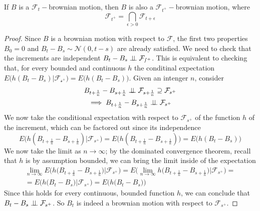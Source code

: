 \begin{proposition}
    If $B$ is a $\mathcal{F}_t-$brownian motion, then $B$ is also a $\mathcal{F}_{t^+}-$brownian motion, where
    \begin{equation*}
        \mathcal{F}_{t^+} = \bigcap_{\epsilon > 0} \mathcal{F}_{t+\epsilon}
    \end{equation*}
\end{proposition}
\begin{proof}
    Since $B$ is a brownian motion with respect to $\mathcal{F}$, the first two properties $B_0 = 0$ and $B_t-B_s \sim \mathcal{N}(0,t-s)$ are already satisfied. We need to check that the increments are independent $B_t-B_s \perp \!\!\! \perp \mathcal{F_{s^+}}$. This is equivalent to checking that, for every bounded and continuous $h$ the conditinal expectation $E\big(h(B_t-B_s) \vert \mathcal{F_{s^+}} \big) = E\big(h(B_t-B_s) \big)$. Given an intenger $n$, consider
    \begin{gather*}
        B_{t+\frac{1}{n}}-B_{s+\frac{1}{n}} \perp \!\!\! \perp \mathcal{F}_{s+\frac{1}{n}} \supseteq \mathcal{F}_{s^+} \\
        \implies B_{t+\frac{1}{n}}-B_{s+\frac{1}{n}} \perp \!\!\! \perp \mathcal{F}_{s^+}
    \end{gather*}
    We now take the conditional expectation with respect to $\mathcal{F}_{s^+}$ of the function $h$ of the increment, which can be factored out since its independence
    \begin{equation*}
        E\big( h(B_{t+\frac{1}{n}}-B_{s+\frac{1}{n}}) \big\vert \mathcal{F}_{s^+} \big) = E\big( h(B_{t+\frac{1}{n}}-B_{s+\frac{1}{n}}) \big) = E\big(h(B_t-B_s)\big)
    \end{equation*}
    We now take the limit as $n \to \infty$; by the dominated convergence theorem, recall that $h$ is by assumption bounded, we can bring the limit inside of the expectation
    \begin{gather*}
        \lim_{n \to \infty} E\Big( h\big(B_{t+\frac{1}{n}}-B_{s+\frac{1}{n}}  \big) \Big\vert \mathcal{F}_{s^+} \Big) = E\Big( \lim_{n\to\infty} h\big( B_{t+\frac{1}{n}} - B_{s+\frac{1}{n}} \big) \Big\vert \mathcal{F}_{s^+} \Big) = \\
        = E\Big( h\big( B_t - B_s \big) \Big\vert \mathcal{F}_{s^+} \Big) = E\Big( h\big( B_t - B_s \big) \Big)
    \end{gather*}
    Since this holds for every continuous, bounded function $h$, we can conclude that $B_t - B_s \perp \!\!\! \perp \mathcal{F}_{s^+}$. So $B_t$ is indeed a brownian motion with respect to $\mathcal{F}_{s^+}$. 
\end{proof}

